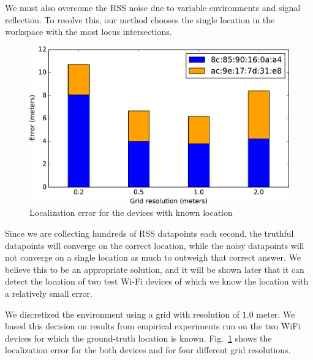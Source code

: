 \documentclass{article}
\begin{document}
We must also overcome the RSS noise 
due to variable environments and signal reflection.
To resolve this, our method chooses the single location in the workspace with the most locus 
intersections. 
\begin{figure}
    \centering
    \vspace{-4pt}
    \includegraphics[width=\linewidth]{figures/grid_resolution_study.pdf}
    \caption{Localization error for the devices with known location \label{fig:grid_resolution_study}}
    \vspace{-10pt}
\end{figure}
Since we are collecting hundreds of RSS datapoints each second, the truthful 
datapoints will converge on the correct location, while the noisy datapoints will not converge on 
a single location as much to outweigh that correct answer. We believe this to be an appropriate 
solution, and it will be shown later that it can detect the location of two test Wi-Fi devices of 
which we know the location with a relatively small error.

We discretized the environment using a grid with resolution of $1.0$ meter. We based this decision 
on results from empirical experiments run on the two WiFi devices for which the ground-truth location 
is known. Fig.~\ref{fig:grid_resolution_study} shows the localization error for the both devices and 
for four different grid resolutions.
\end{document}
